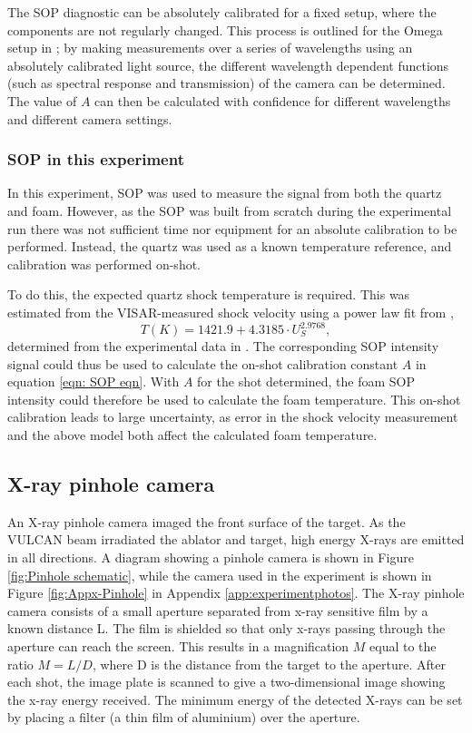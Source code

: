 The SOP diagnostic can be absolutely calibrated for a fixed setup, where the components are not regularly changed. This process is outlined for the Omega setup in \cite{Gregor2016}; by making measurements over a series of wavelengths using an absolutely calibrated light source, the different wavelength dependent functions (such as spectral response and transmission) of the camera can be determined. The value of $A$ can then be calculated with confidence for different wavelengths and different camera settings. 

\subsubsection{SOP in this experiment}

In this experiment, SOP was used to measure the signal from both the quartz and foam. However, as the SOP was built from scratch during the experimental run there was not sufficient time nor equipment for an absolute calibration to be performed. Instead, the quartz was used as a known temperature reference, and calibration was performed on-shot.

To do this, the expected quartz shock temperature is required. This was estimated from the VISAR-measured shock velocity using a power law fit from \cite{Millot2015}, \begin{equation} T(K) = 1421.9 + 4.3185 \cdot U_S^{2.9768}, \label{eqn:Temp fit} \end{equation} determined from the experimental data in \cite{Hicks2006}. The corresponding SOP intensity signal could thus be used to calculate the on-shot calibration constant $A$ in equation \ref{eqn: SOP eqn}. With $A$ for the shot determined, the foam SOP intensity could therefore be used to calculate the foam temperature. This on-shot calibration leads to large uncertainty, as error in the shock velocity measurement and the above model both affect the calculated foam temperature.

\subsection{X-ray pinhole camera}
An X-ray pinhole camera imaged the front surface of the target. As the VULCAN beam irradiated the ablator and target, high energy X-rays are emitted in all directions. A diagram showing a pinhole camera is shown in Figure \ref{fig:Pinhole schematic}, while the camera used in the experiment is shown in Figure \ref{fig:Appx-Pinhole} in Appendix \ref{app:experimentphotos}. The X-ray pinhole camera consists of a small aperture separated from x-ray sensitive film by a known distance L. The film is shielded so that only x-rays passing through the aperture can reach the screen. This results in a magnification $M$ equal to the ratio $M = L/D$, where D is the distance from the target to the aperture. After each shot, the image plate is scanned to give a two-dimensional image showing the x-ray energy received. The minimum energy of the detected X-rays can be set by placing a filter (a thin film of aluminium) over the aperture.

